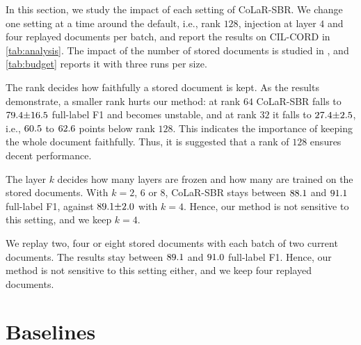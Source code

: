 \noindent In this section, we study the impact of each setting of CoLaR-SBR. We change one setting at a time around the default, i.e., rank $128$, injection at layer $4$ and four replayed documents per batch, and report the results on CIL-CORD in \cref{tab:analysis}. The impact of the number of stored documents is studied in , and \cref{tab:budget} reports it with three runs per size.

\begin{table}[h]
\centering\small
\setlength{\tabcolsep}{4pt}
\caption{\textbf{Model analysis} of CoLaR-SBR on CIL-CORD: one setting changes at a time (bold: the default). Mean $\pm$ s.d.\ of three runs.}
\label{tab:analysis}
\resizebox{\linewidth}{!}{}
\end{table}

 The rank decides how faithfully a stored document is kept. As the results demonstrate, a smaller rank hurts our method: at rank $64$ CoLaR-SBR falls to $79.4{\pm}16.5$ full-label F1 and becomes unstable, and at rank $32$ it falls to $27.4{\pm}2.5$, i.e., $60.5$ to $62.6$ points below rank $128$. This indicates the importance of keeping the whole document faithfully. Thus, it is suggested that a rank of $128$ ensures decent performance.

 The layer $k$ decides how many layers are frozen and how many are trained on the stored documents. With $k=2$, $6$ or $8$, CoLaR-SBR stays between $88.1$ and $91.1$ full-label F1, against $89.1{\pm}2.0$ with $k=4$. Hence, our method is not sensitive to this setting, and we keep $k=4$.

 We replay two, four or eight stored documents with each batch of two current documents. The results stay between $89.1$ and $91.0$ full-label F1. Hence, our method is not sensitive to this setting either, and we keep four replayed documents.

\section{Baselines}
\label{app:baselines}

\begin{table}[t]
\centering\scriptsize
\setlength{\tabcolsep}{3pt}
\caption{\textbf{Baseline card} (the methods of ): what our re-implementation changes against the published method, and what it keeps across sessions.}
\label{tab:baselinecard}

\end{table}

